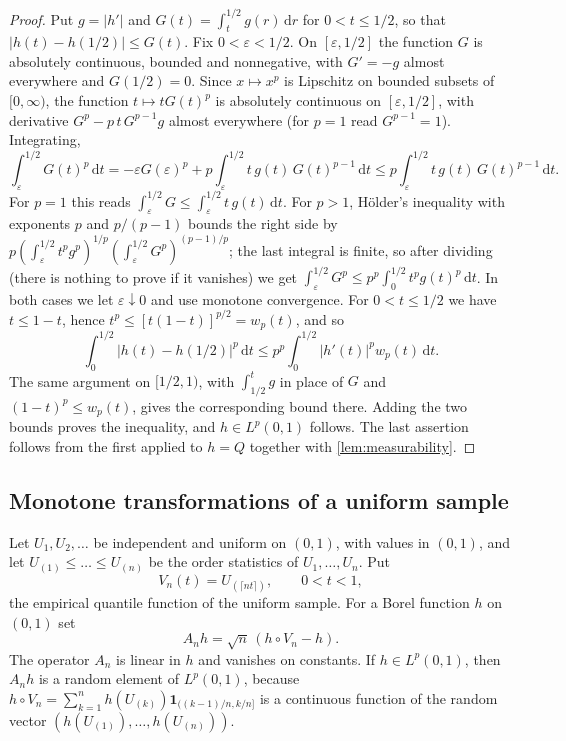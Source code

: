 \documentclass[11pt]{amsart}
\newtheorem{lemma}[theorem]{Lemma}
\theoremstyle{remark}
\newcommand{\ind}{\mathbf{1}}
\newcommand{\dd}{\,\mathrm{d}}
\newcommand{\Lp}{L^p(0,1)}
\begin{document}

\begin{proof}
Put $g=|h'|$ and $G(t)=\int_t^{1/2}g(r)\dd r$ for $0<t\le1/2$, so that $|h(t)-h(1/2)|\le G(t)$. Fix $0<\varepsilon<1/2$. On $[\varepsilon,1/2]$ the function $G$ is absolutely continuous, bounded and nonnegative, with $G'=-g$ almost everywhere and $G(1/2)=0$. Since $x\mapsto x^p$ is Lipschitz on bounded subsets of $[0,\infty)$, the function $t\mapsto tG(t)^p$ is absolutely continuous on $[\varepsilon,1/2]$, with derivative $G^p-p\,t\,G^{p-1}g$ almost everywhere (for $p=1$ read $G^{p-1}=1$). Integrating,
\[
\int_\varepsilon^{1/2}G(t)^p\dd t=-\varepsilon G(\varepsilon)^p+p\int_\varepsilon^{1/2}t\,g(t)\,G(t)^{p-1}\dd t\le p\int_\varepsilon^{1/2}t\,g(t)\,G(t)^{p-1}\dd t .
\]
For $p=1$ this reads $\int_\varepsilon^{1/2}G\le\int_\varepsilon^{1/2}t\,g(t)\dd t$. For $p>1$, H\"older's inequality with exponents $p$ and $p/(p-1)$ bounds the right side by $p(\int_\varepsilon^{1/2}t^pg^p)^{1/p}(\int_\varepsilon^{1/2}G^p)^{(p-1)/p}$; the last integral is finite, so after dividing (there is nothing to prove if it vanishes) we get $\int_\varepsilon^{1/2}G^p\le p^p\int_0^{1/2}t^pg(t)^p\dd t$. In both cases we let $\varepsilon\downarrow0$ and use monotone convergence. For $0<t\le1/2$ we have $t\le1-t$, hence $t^p\le[t(1-t)]^{p/2}=w_p(t)$, and so
\[
\int_0^{1/2}|h(t)-h(1/2)|^p\dd t\le p^p\int_0^{1/2}|h'(t)|^pw_p(t)\dd t .
\]
The same argument on $[1/2,1)$, with $\int_{1/2}^t g$ in place of $G$ and $(1-t)^p\le w_p(t)$, gives the corresponding bound there. Adding the two bounds proves the inequality, and $h\in\Lp$ follows. The last assertion follows from the first applied to $h=Q$ together with \cref{lem:measurability}.
\end{proof}

\subsection{Monotone transformations of a uniform sample}

Let $U_1,U_2,\dots$ be independent and uniform on $(0,1)$, with values in $(0,1)$, and let $U_{(1)}\le\dots\le U_{(n)}$ be the order statistics of $U_1,\dots,U_n$. Put
\[
V_n(t)=U_{(\lceil nt\rceil)},\qquad 0<t<1,
\]
the empirical quantile function of the uniform sample. For a Borel function $h$ on $(0,1)$ set
\[
A_nh=\sqrt n\,(h\circ V_n-h).
\]
The operator $A_n$ is linear in $h$ and vanishes on constants. If $h\in\Lp$, then $A_nh$ is a random element of $\Lp$, because $h\circ V_n=\sum_{k=1}^nh(U_{(k)})\ind_{((k-1)/n,k/n]}$ is a continuous function of the random vector $(h(U_{(1)}),\dots,h(U_{(n)}))$.
\end{document}
